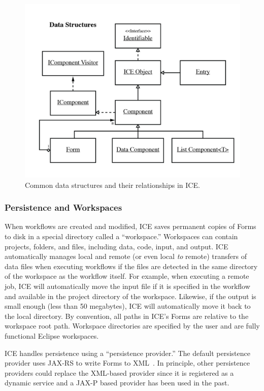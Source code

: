 \begin{figure}[htbp]
\centering
\includegraphics[width=\textwidth]{src/images/ICE-arch-4.jpg}
\caption{Common data structures and their relationships in ICE.}
\label{data-arch}
\end{figure}

\subsubsection{Persistence and
Workspaces}\label{persistence-and-workspaces}

When workflows are created and modified, ICE saves permanent copies of 
Forms to disk in a special directory called a ``workspace.''
Workspaces can contain projects, folders, and files, including data,
code, input, and output. ICE automatically manages local and remote (or
even local \emph{to} remote) transfers of data files when executing
workflows if the files are detected in the same directory of the
workspace as the workflow itself. For example, when executing a remote
job, ICE will automatically move the input file if it is specified in
the workflow and available in the project directory of the workspace.
Likewise, if the output is small enough (less than 50 megabytes), ICE will automatically move it back
to the local directory. By convention, all paths in ICE's Forms are
relative to the workspace root path. Workspace directories are specified
by the user and are fully functional Eclipse workspaces.

ICE handles persistence using a ``persistence provider.'' The
default persistence provider uses JAX-RS to write Forms to 
XML~\cite{burke_restful_2010}. In principle, other persistence providers 
could replace the XML-based provider since it is registered as a dynamic 
service and a JAX-P based provider has been used in the past.

